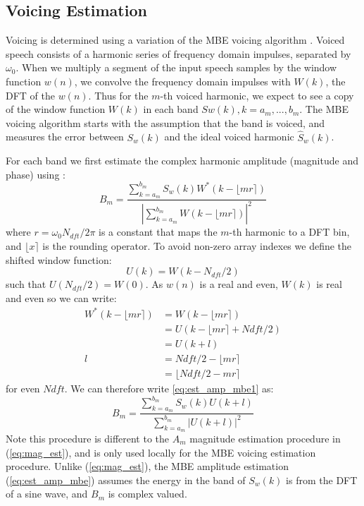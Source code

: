 \documentclass{article}
\begin{document}
{\subsection{Voicing Estimation}

Voicing is determined using a variation of the MBE voicing algorithm \cite{griffin1988multiband}.  Voiced speech consists of a harmonic series of frequency domain impulses, separated by $\omega_0$.  When we multiply a segment of the input speech samples by the window function $w(n)$, we convolve the frequency domain impulses with $W(k)$, the DFT of the $w(n)$.  Thus for the $m$-th voiced harmonic, we expect to see a copy of the window function $W(k)$ in each band $Sw(k), k=a_m,...,b_m$.  The MBE voicing algorithm starts with the assumption that the band is voiced, and measures the error between $S_w(k)$ and the ideal voiced harmonic $\hat{S}_w(k)$.

For each band we first estimate the complex harmonic amplitude (magnitude and phase) using \cite{griffin1988multiband}:
\begin{equation}
\label{eq:est_amp_mbe1}
B_m = \frac{\sum_{k=a_m}^{b_m} S_w(k) W^* (k - \lfloor mr \rceil)}{|\sum_{k=a_m}^{b_m} W (k - \lfloor mr \rceil)|^2}
\end{equation}
where $r= \omega_0 N_{dft}/2 \pi$ is a constant that maps the $m$-th harmonic to a DFT bin, and $ \lfloor x \rceil$ is the rounding operator.  To avoid non-zero array indexes we define the shifted window function:
\begin{equation}
U(k) = W(k-N_{dft}/2)
\end{equation}
such that $U(N_{dft}/2)=W(0)$. As $w(n)$ is a real and even, $W(k)$ is real and even so we can write:
\begin{equation}
\begin{split}
W^* (k - \lfloor mr \rceil) &= W(k - \lfloor mr \rceil) \\
                            &= U(k - \lfloor mr \rceil + Ndft/2) \\
                            &= U(k + l) \\
                          l &= Ndft/2  - \lfloor mr \rceil  \\
                            & = \lfloor Ndft/2  - mr \rceil
\end{split}
\end{equation}
for even $Ndft$.  We can therefore write \ref{eq:est_amp_mbe1} as:
\begin{equation}
\label{eq:est_amp_mbe}
B_m = \frac{\sum_{k=a_m}^{b_m} S_w(k) U(k + l)}{\sum_{k=a_m}^{b_m} |U (k + l)|^2}
\end{equation}
Note this procedure is different to the $A_m$ magnitude estimation procedure in (\ref{eq:mag_est}), and is only used locally for the MBE voicing estimation procedure.  Unlike (\ref{eq:mag_est}), the MBE amplitude estimation (\ref{eq:est_amp_mbe}) assumes the energy in the band of $S_w(k)$ is from the DFT of a sine wave, and $B_m$ is complex valued.

}
\end{document}
